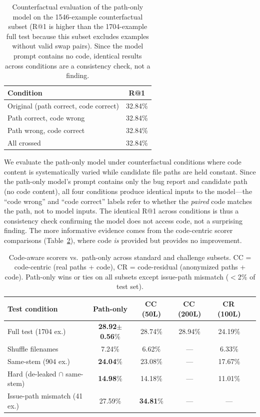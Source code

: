 \documentclass{article}
\begin{document}
\begin{table}[h]
\centering
\caption{Counterfactual evaluation of the path-only model on the 1546-example counterfactual subset (R@1 is higher than the 1704-example full test because this subset excludes examples without valid swap pairs). Since the model prompt contains no code, identical results across conditions are a consistency check, not a finding.}
\label{tab:counterfactual}
\small
\begin{tabular}{lc}
\toprule
\textbf{Condition} & \textbf{R@1} \\
\midrule
Original (path correct, code correct) & 32.84\% \\
Path correct, code wrong & 32.84\% \\
Path wrong, code correct & 32.84\% \\
All crossed & 32.84\% \\
\bottomrule
\end{tabular}
\end{table}

We evaluate the path-only model under counterfactual conditions where code content is systematically varied while candidate file paths are held constant. Since the path-only model's prompt contains only the bug report and candidate path (no code content), all four conditions produce identical inputs to the model---the ``code wrong'' and ``code correct'' labels refer to whether the \emph{paired} code matches the path, not to model inputs. The identical R@1 across conditions is thus a consistency check confirming the model does not access code, not a surprising finding. The more informative evidence comes from the code-centric scorer comparisons (Table~\ref{tab:code_centric}), where code \emph{is} provided but provides no improvement.

\begin{table}[h]
\centering
\caption{Code-aware scorers vs.\ path-only across standard and challenge subsets. CC = code-centric (real paths + code), CR = code-residual (anonymized paths + code). Path-only wins or ties on all subsets except issue-path mismatch ($<$2\% of test set).}
\label{tab:code_centric}
\small
\begin{tabular}{lccccc}
\toprule
\textbf{Test condition} & \textbf{Path-only} & \textbf{CC\,(50L)} & \textbf{CC\,(200L)} & \textbf{CR\,(100L)} \\
\midrule
Full test (1704 ex.) & \textbf{28.92$\pm$0.56}\% & 28.74\% & 28.94\% & 24.19\% \\
Shuffle filenames & 7.24\% & 6.62\% & --- & 6.33\% \\
\midrule
Same-stem (904 ex.) & \textbf{24.04}\% & 23.08\% & --- & 17.67\% \\
Hard (de-leaked $\cap$ same-stem) & \textbf{14.98}\% & 14.18\% & --- & 11.01\% \\
Issue-path mismatch (41 ex.) & 27.59\% & \textbf{34.81}\% & --- & --- \\
\bottomrule
\end{tabular}
\end{table}
\end{document}
